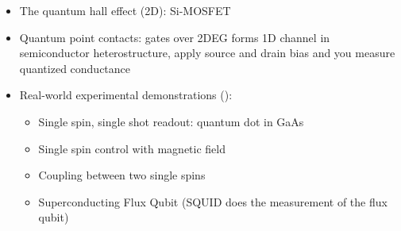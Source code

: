 \begin{itemize}
    \item The quantum hall effect (2D): Si-MOSFET \parencite{vonKlitzing1980}
    \item Quantum point contacts: gates over 2DEG forms 1D channel in semiconductor heterostructure, apply source and drain bias and you measure quantized conductance \parencite{vanWees1988}
    \item Real-world experimental demonstrations ():
          \begin{itemize}
              \item Single spin, single shot readout: quantum dot in GaAs \parencite{Elzerman2004}
              \item Single spin control with magnetic field \parencite{Koppens2006}
              \item Coupling between two single spins \parencite{Petta2005}
              \item Superconducting Flux Qubit \parencite{Mooij1999} (SQUID does the measurement of the flux qubit)
          \end{itemize}
\end{itemize}


